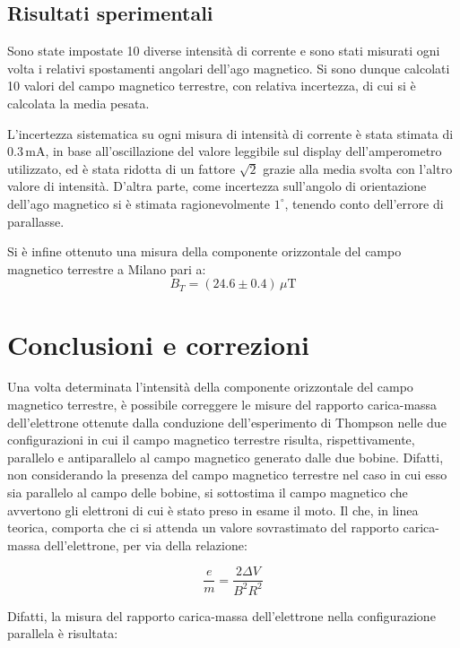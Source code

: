\documentclass[a4paper,12pt]{article}
\begin{document}
\subsection{Risultati sperimentali}
Sono state impostate 10 diverse intensità di corrente e sono stati misurati ogni volta i relativi spostamenti angolari dell’ago magnetico. Si sono dunque calcolati 10 valori del campo magnetico terrestre, con relativa incertezza, di cui si è calcolata la media pesata.

L’incertezza sistematica su ogni misura di intensità di corrente è stata stimata di \( 0.3 \, \text{mA} \), in base all’oscillazione del valore leggibile sul display dell’amperometro utilizzato, ed è stata ridotta di un fattore \( \sqrt{2} \) grazie alla media svolta con l’altro valore di intensità. D’altra parte, come incertezza sull’angolo di orientazione dell’ago magnetico si è stimata ragionevolmente \( 1^\circ \), tenendo conto dell’errore di parallasse.

Si è infine ottenuto una misura della componente orizzontale del campo magnetico terrestre a Milano pari a:
\[
    B_T = (24.6 \pm 0.4) \, \mu\text{T}
\]

\section{Conclusioni e correzioni}

Una volta determinata l’intensità della componente orizzontale del campo magnetico terrestre, è possibile correggere le misure del rapporto carica-massa dell’elettrone ottenute dalla conduzione dell’esperimento di Thompson nelle due configurazioni in cui il campo magnetico terrestre risulta, rispettivamente, parallelo e antiparallelo al campo magnetico generato dalle due bobine. 
Difatti, non considerando la presenza del campo magnetico terrestre nel caso in cui esso sia parallelo al campo delle bobine, si sottostima il campo magnetico che avvertono gli elettroni di cui è stato preso in esame il moto. Il che, in linea teorica, comporta che ci si attenda un valore sovrastimato del rapporto carica-massa dell’elettrone, per via della relazione:

\begin{equation}
    \frac{e}{m} = \frac{2 \Delta V}{B^2 R^2} \label{eq:em_relation}
\end{equation}

Difatti, la misura del rapporto carica-massa dell’elettrone nella configurazione parallela è risultata:
\end{document}

